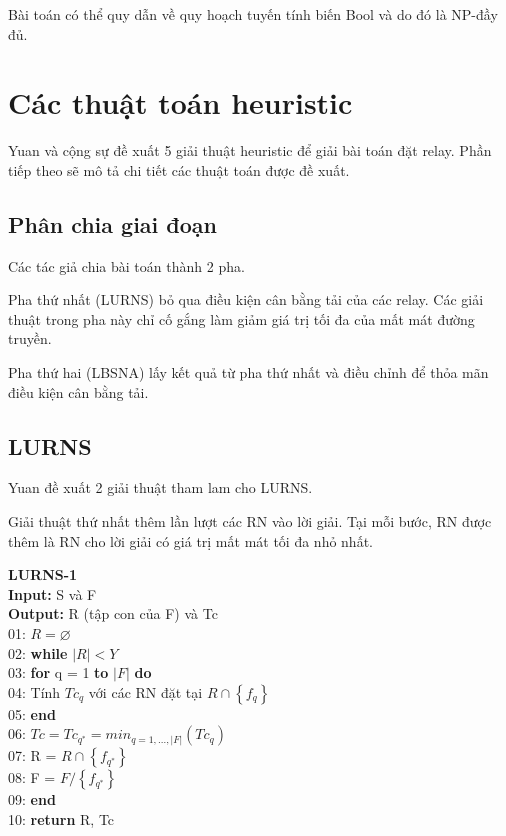 \documentclass[hidelinks, 11pt, a4paper]{report}
\newenvironment{codeb}{\code}{\par}
\begin{document}
Bài toán có thể quy dẫn về quy hoạch tuyến tính biến Bool và do đó là NP-đầy đủ.

\chapter{Các thuật toán heuristic}
Yuan và cộng sự \cite{YuanWusn} đề xuất 5 giải thuật heuristic để giải bài toán đặt relay. Phần tiếp theo sẽ mô tả chi tiết các thuật toán được đề xuất.

\section{Phân chia giai đoạn}
Các tác giả chia bài toán thành 2 pha. 

Pha thứ nhất (LURNS) bỏ qua điều kiện cân bằng tải của các relay. Các giải thuật trong pha này chỉ cố gắng làm giảm giá trị tối đa của mất mát đường truyền.

Pha thứ hai (LBSNA) lấy kết quả từ pha thứ nhất và điều chỉnh để thỏa mãn điều kiện cân bằng tải.

\section{LURNS}
Yuan đề xuất 2 giải thuật tham lam cho LURNS.

Giải thuật thứ nhất thêm lần lượt các RN vào lời giải. Tại mỗi bước, RN được thêm là RN cho lời giải có giá trị mất mát tối đa nhỏ nhất.

\textbf{LURNS-1}\\
\begin{codeb}
    \textbf{Input:} S và F\\
    \textbf{Output:} R (tập con của F) và Tc\\
    01: $R = \varnothing$\\
    02: \textbf{while} $|R| < Y$\\
    03: \hspace{2mm}\textbf{for} q = 1 \textbf{to} $|F|$ \textbf{do}\\
    04: \hspace{4mm}Tính $Tc_{q}$ với các RN đặt tại $R \cap \left\{f_q\right\} $ \\
    05: \hspace{2mm}\textbf{end}\\
    06: \hspace{2mm}$Tc = Tc_{q^*} = min_{q=1,...,|F|}(Tc_q)$\\
    07: \hspace{2mm}R = $R\cap \left\{f_{q^*}\right\}$\\
    08: \hspace{2mm}F = $F/\left\{f_{q^*}\right\}$\\
    09: \textbf{end}\\
    10: \textbf{return} R, Tc
\end{codeb}
\end{document}
